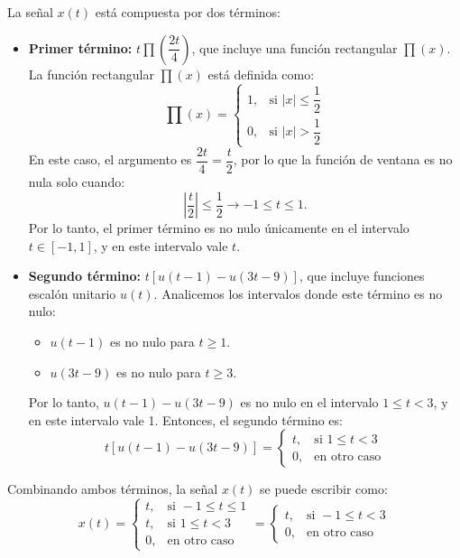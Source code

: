 \begin{enumerate}[label=\color{red}\textbf{\arabic*)}]
    La señal $x(t)$ está compuesta por dos términos:
    \begin{itemize}[label=\textbullet]
        \item \textbf{Primer término:} $t\prod\left( \dfrac{2t}{4} \right) $, que incluye una función rectangular $\prod(x)$. La función rectangular $\prod(x)$ está definida como:  \[
        \prod(x)=\begin{cases}
            1, & \text{si }|x|\le \dfrac{1}{2}\\
            0, & \text{si }|x| > \dfrac{1}{2}
        \end{cases}
        \]  
        En este caso, el argumento es $\dfrac{2t}{4}=\dfrac{t}{2}$, por lo que la función de ventana es no nula solo cuando: \[
        \left| \dfrac{t}{2} \right| \le \dfrac{1}{2}\longrightarrow -1\le t\le 1.
        \] 
        Por lo tanto, el primer término es no nulo únicamente en el intervalo $t\in [-1,1]$, y en este intervalo vale $t$.
    \item  \textbf{Segundo término:} $t[u(t-1)-u(3t-9)]$, que incluye funciones escalón unitario $u(t)$. Analicemos los intervalos donde este término es no nulo:
        \begin{itemize}[label=\textbullet]
            \item $u(t-1)$ es no nulo para  $t\ge 1$.
            \item $u(3t-9)$ es no nulo para  $t\ge 3$.
        \end{itemize}
        Por lo tanto, $u(t-1)-u(3t-9)$ es no nulo en el intervalo  $1\le t<3$, y en este intervalo vale 1. Entonces, el segundo término es: \[
            t[u(t-1)-u(3t-9)]=\begin{cases}
                t, & \text{si }1\le t<3\\
                0, & \text{en otro caso}
            \end{cases}
        \] 
    \end{itemize}
    Combinando ambos términos, la señal $x(t)$ se puede escribir como: \[
    x(t)=\begin{cases}
        t, & \text{si }-1\le t\le 1\\
        t, & \text{si }1\le t<3\\
        0, & \text{en otro caso}
    \end{cases}=\begin{cases}
        t, & \text{si }-1\le t<3\\
        0, & \text{en otro caso}
    \end{cases}
    \]

\end{enumerate}
